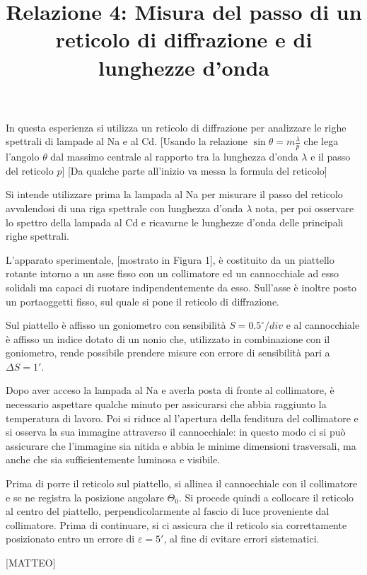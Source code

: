 \documentclass{article}
\title{Relazione 4: Misura del passo di un reticolo di diffrazione
	e di lunghezze d'onda}
\date{}
\begin{document}
	\maketitle
	
	
	In questa esperienza si utilizza un reticolo di diffrazione per analizzare le righe spettrali di lampade al Na e al Cd. [Usando la relazione $\sin{\theta}=m\frac{\lambda}{p}$ che lega l'angolo $\theta$ dal massimo centrale al rapporto tra la lunghezza d'onda $\lambda$ e il passo del reticolo $p$] [Da qualche parte all'inizio va messa la formula del reticolo]
	
	Si intende utilizzare prima la lampada al Na per misurare il passo del reticolo avvalendosi di una riga spettrale con lunghezza d'onda $\lambda$ nota, per poi osservare lo spettro della lampada al Cd e ricavarne le lunghezze d'onda delle principali righe spettrali.
	
	L'apparato sperimentale, [mostrato in Figura 1], è costituito da un piattello rotante intorno a un asse fisso con un collimatore ed un cannocchiale ad esso solidali ma capaci di ruotare indipendentemente da esso. Sull'asse è inoltre posto un portaoggetti fisso, sul quale si pone il reticolo di diffrazione.
	
	Sul piattello è affisso un goniometro con sensibilità $S=0.5^{\circ} / div$ e al cannocchiale è affisso un indice dotato di un nonio che, utilizzato in combinazione con il goniometro, rende possibile prendere misure con errore di sensibilità pari a $\Delta S = 1'$.

 Dopo aver acceso la lampada al Na e averla posta di fronte al collimatore, è necessario aspettare qualche minuto per assicurarsi che abbia raggiunto la temperatura di lavoro. Poi si riduce al l'apertura della fenditura del collimatore e si osserva la sua immagine attraverso il cannocchiale: in questo modo ci si può assicurare che l'immagine sia nitida e abbia le minime dimensioni trasversali, ma anche che sia sufficientemente luminosa e visibile.

Prima di porre il reticolo sul piattello, si allinea il cannocchiale con il collimatore e se ne registra la posizione angolare $\Theta_0$. Si procede quindi a collocare il reticolo al centro del piattello, perpendicolarmente al fascio di luce proveniente dal collimatore. Prima di continuare, si ci assicura che il reticolo sia correttamente posizionato entro un errore di $\varepsilon = 5'$, al fine di evitare errori sistematici.
	
 [MATTEO]



 
	
	
\end{document}
